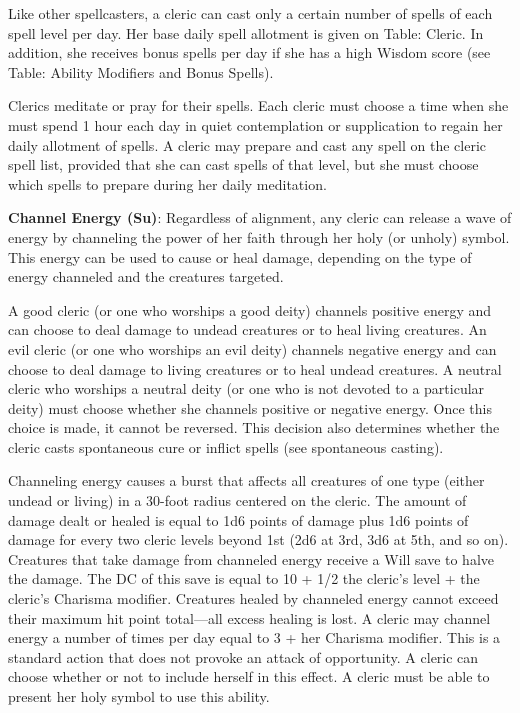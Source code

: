 Like other spellcasters, a cleric can cast only a certain number of spells of each spell level per day. Her base daily spell allotment is given on Table: Cleric. In addition, she receives bonus spells per day if she has a high Wisdom score (see Table: Ability Modifiers and Bonus Spells). 
				
Clerics meditate or pray for their spells. Each cleric must choose a time when she must spend 1 hour each day in quiet contemplation or supplication to regain her daily allotment of spells. A cleric may prepare and cast any spell on the cleric spell list, provided that she can cast spells of that level, but she must choose which spells to prepare during her daily meditation.
				
\textbf{Channel Energy (Su)}: Regardless of alignment, any cleric can release a wave of energy by channeling the power of her faith through her holy (or unholy) symbol. This energy can be used to cause or heal damage, depending on the type of energy channeled and the creatures targeted. 
				
A good cleric (or one who worships a good deity) channels positive energy and can choose to deal damage to undead creatures or to heal living creatures. An evil cleric (or one who worships an evil deity) channels negative energy and can choose to deal damage to living creatures or to heal undead creatures. A neutral cleric who worships a neutral deity (or one who is not devoted to a particular deity) must choose whether she channels positive or negative energy. Once this choice is made, it cannot be reversed. This decision also determines whether the cleric casts spontaneous cure or inflict spells (see spontaneous casting). 
				
Channeling energy causes a burst that affects all creatures of one type (either undead or living) in a 30-foot radius centered on the cleric. The amount of damage dealt or healed is equal to 1d6 points of damage plus 1d6 points of damage for every two cleric levels beyond 1st (2d6 at 3rd, 3d6 at 5th, and so on). Creatures that take damage from channeled energy receive a Will save to halve the damage. The DC of this save is equal to 10 + 1/2 the cleric's level + the cleric's Charisma modifier. Creatures healed by channeled energy cannot exceed their maximum hit point total---all excess healing is lost. A cleric may channel energy a number of times per day equal to 3 + her Charisma modifier. This is a standard action that does not provoke an attack of opportunity. A cleric can choose whether or not to include herself in this effect. A cleric must be able to present her holy symbol to use this ability. 
				
